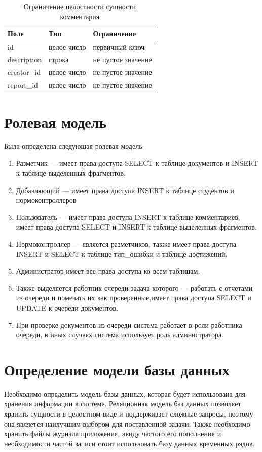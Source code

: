 \begin{table}[h!tbp]
	\centering
	\caption{Ограничение целостности сущности комментария}
	\begin{tabularx}{\textwidth}{|X|X|X|}
		\hline
		Поле & Тип & Ограничение \\
		\hline
		id & целое число & первичный ключ\\
		\hline
		description & строка & не пустое значение\\
		\hline
		creator\_id & целое число & не пустое значение\\
		\hline
		report\_id & целое число & не пустое значение\\
		\hline
	\end{tabularx}
	\label{t:comment_cons}
\end{table}






\section{Ролевая модель}
Была определена следующая ролевая модель:
\begin{enumerate}
	\item Разметчик --- имеет права доступа SELECT к таблице документов и INSERT к таблице выделенных фрагментов.
	\item Добавляющий --- имеет права доступа INSERT к таблице студентов и нормоконтроллеров
	\item Пользователь --- имеет права доступа INSERT к таблице комментариев, имеет права доступа SELECT  и INSERT к таблице выделенных фрагментов.
	\item Нормоконтроллер --- является разметчиков, также имеет права доступа INSERT и SELECT к таблице тип\_ошибки и таблице достижений.
	\item Администратор имеет все права доступа ко всем таблицам.
	\item Также выделяется работник очереди задача которого --- работать с отчетами из очереди и помечать их как проверенные,имеет права доступа SELECT и UPDATE к очереди документов.
	\item При проверке документов из очереди система работает в роли работника очереди, в иных случаях система использует роль администратора.
\end{enumerate}

\section{Определение модели базы данных}
Необходимо определить модель базы данных, которая будет использована для хранения информации в системе. Реляционная модель баз данных позволяет хранить сущности в целостном виде и поддерживает сложные запросы, поэтому она является наилучшим выбором для поставленной задачи. Также необходимо хранить файлы журнала приложения, ввиду частого его пополнения и необходимости частой записи стоит использовать базу данных временных рядов.

